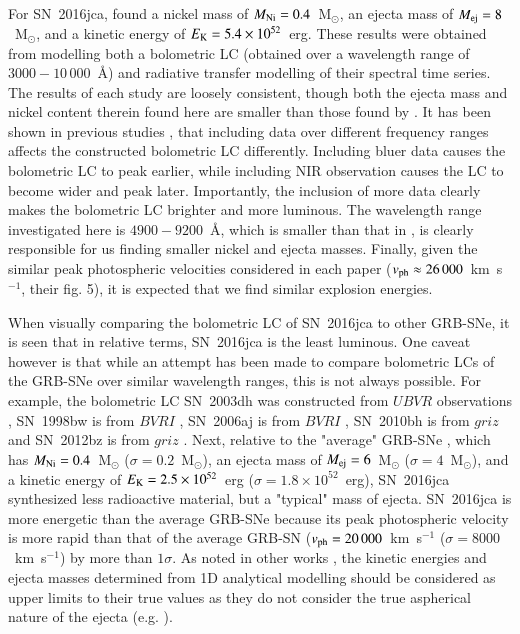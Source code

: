 \documentclass[traditabstract,longauth]{aa}
\begin{document}
\begin{figure}
         \label{FigMagModel}
\end{figure}







For SN~2016jca, \citet{Ashall17} found a nickel mass of $M_{\rm Ni} = 0.4$~M$_{\odot}$, an ejecta mass of $M_{\rm ej} = 8$~M$_{\odot}$, and a kinetic energy of $E_{\rm K} = 5.4\times10^{52}$~erg.  These results were obtained from modelling both a bolometric LC (obtained over a wavelength range of $3000-10\,000$~\AA) and radiative transfer modelling of their spectral time series.  The results of each study are loosely consistent, though both the ejecta mass and nickel content therein found here are smaller than those found by \citet{Ashall17}.  It has been shown in previous studies \citep{Modjaz09,Cano2011b,Lyman14}, that including data over different frequency ranges affects the constructed bolometric LC differently.  Including bluer data causes the bolometric LC to peak earlier, while including NIR observation causes the LC to become wider and peak later.  Importantly, the inclusion of more data clearly makes the bolometric LC brighter and more luminous.  The wavelength range investigated here is $4900-9200$~\AA, which is smaller than that in \citet{Ashall17}, is clearly responsible for us finding smaller nickel and ejecta masses.  Finally, given the similar peak photospheric velocities considered in each paper ($v_{\rm ph} \approx 26\,000$~km~s$^{-1}$, their fig. 5), it is expected that we find similar explosion energies.

When visually comparing the bolometric LC of SN~2016jca to other GRB-SNe, it is seen that in relative terms, SN~2016jca is the least luminous.  One caveat however is that while an attempt has been made to compare bolometric LCs of the GRB-SNe over similar wavelength ranges, this is not always possible.  For example, the bolometric LC SN~2003dh was constructed from $UBVR$ observations \citep{Deng05}, SN~1998bw is from $BVRI$ \citep{Patat01}, SN~2006aj is from $BVRI$ \citep{Pian06}, SN~2010bh is from $griz$ \citep{Olivares12} and SN~2012bz is from $griz$ \citep{Schulze14}.  Next, relative to the "average" GRB-SNe \citep{Cano2016}, which has $M_{\rm Ni} = 0.4$~M$_{\odot}$ ($\sigma=0.2$~M$_{\odot}$), an ejecta mass of $M_{\rm ej} = 6$~M$_{\odot}$ ($\sigma=4$~M$_{\odot}$), and a kinetic energy of $E_{\rm K} = 2.5\times10^{52}$~erg ($\sigma=1.8\times10^{52}$~erg), SN~2016jca synthesized less radioactive material, but a "typical" mass of ejecta.  SN~2016jca is more energetic than the average GRB-SNe because its peak photospheric velocity is more rapid than that of the average GRB-SN ($v_{\rm ph} = 20\,000$~km~s$^{-1}$ ($\sigma=8000$~km~s$^{-1}$) by more than $1\sigma$.  As noted in other works \citep{Mazzali14,Ashall17}, the kinetic energies and ejecta masses determined from 1D analytical modelling should be considered as upper limits to their true values as they do not consider the true aspherical nature of the ejecta (e.g. \citealt{Mazzali01,Maeda02,Maeda06,WangWheeler08}).
\end{document}
